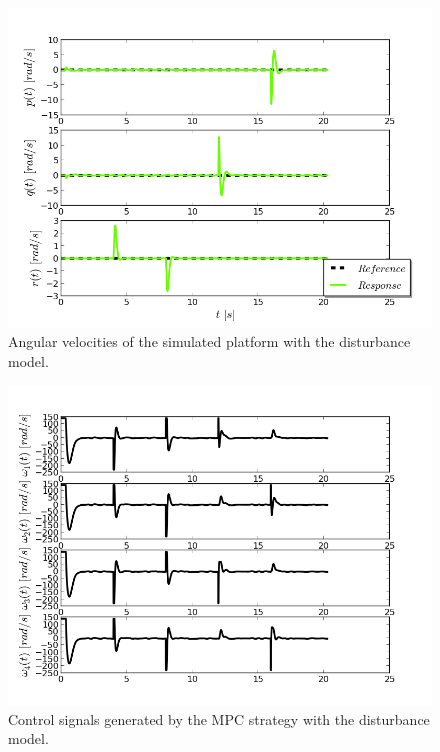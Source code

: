 \begin{figure}[H]
\centering
\includegraphics[scale=0.7]{Images/Chapter5/ardrone/T1_noise/ang_velocity_control.png}
\caption{Angular velocities of the simulated platform with the disturbance model.}
\label{fig:ardrone_ang_vel2}
\end{figure}

\begin{figure}[H]
\centering
\includegraphics[scale=0.7]{Images/Chapter5/ardrone/T1_noise/control_signals.png}
\caption{Control signals generated by the MPC strategy with the disturbance model.}
\label{fig:ardrone_inputs2}
\end{figure}

